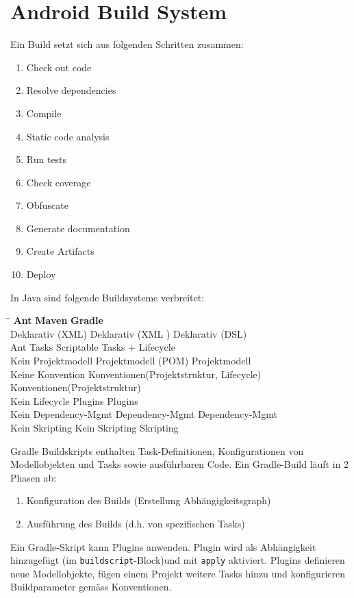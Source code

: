 \chapter{Android Build System}

Ein Build setzt sich aus folgenden Schritten zusammen:
\begin{enumerate}
	\item Check out code
	\item Resolve dependencies
	\item Compile
	\item Static code analysis
	\item Run tests
	\item Check coverage
	\item Obfuscate
	\item Generate documentation
	\item Create Artifacts
	\item Deploy
\end{enumerate}
In Java sind folgende Buildsysteme verbreitet:
\begin{tabbing}
	\hspace{4.2cm}\=\hspace{7cm}\=\kill
	\textbf{Ant} \> \textbf{Maven} \> \textbf{Gradle} \\ 
	Deklarativ (XML) \> Deklarativ (XML ) \> Deklarativ (DSL) \\ 
	Ant Tasks \>  \> Scriptable Tasks + Lifecycle \\ 
	Kein Projektmodell \> Projektmodell (POM) \> Projektmodell \\ 
	Keine Konvention \> Konventionen(Projektstruktur, Lifecycle)  \> Konventionen(Projektstruktur) \\ 
	Kein Lifecycle \> Plugins \> Plugins \\ 
	Kein Dependency-Mgmt \> Dependency-Mgmt \> Dependency-Mgmt \\ 
	Kein Skripting \> Kein Skripting \> Skripting
\end{tabbing}
Gradle Buildskripts enthalten Task-Definitionen, Konfigurationen von Modellobjekten und Tasks sowie ausführbaren Code. Ein Gradle-Build läuft in 2 Phasen ab:
\begin{enumerate}
	\item Konfiguration des Builds (Erstellung Abhängigkeitsgraph)
	\item Ausführung des Builds (d.h. von spezifischen Tasks)
\end{enumerate}
Ein Gradle-Skript kann Plugins anwenden. Plugin wird als Abhängigkeit hinzugefügt (im \texttt{buildscript}-Block)und mit \texttt{apply} aktiviert. Plugins definieren neue Modellobjekte, fügen einem Projekt weitere Tasks hinzu und konfigurieren Buildparameter gemäss Konventionen.

